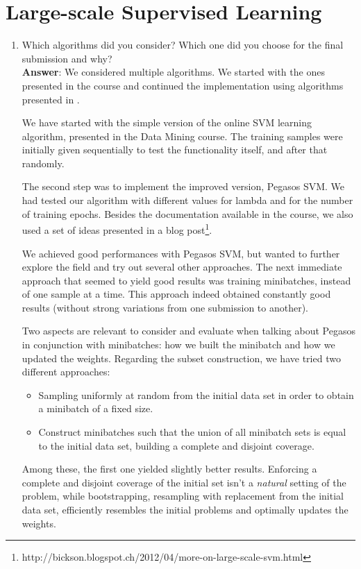 \documentclass[11pt]{article}
\begin{document}
\section{Large-scale Supervised Learning}

\begin{enumerate}
\item Which algorithms did you consider? Which one did you choose for the
  final submission and why? \\
  
\textbf{Answer}: We considered multiple algorithms. We started with the
ones presented in the course and continued the implementation using
algorithms presented in \cite{Sculley09}.

We have started with the simple version of the online SVM learning
algorithm, presented in the Data Mining course. The training samples
were initially given sequentially to test the functionality itself, and
after that randomly.

The second step was to implement the improved version, Pegasos SVM. We
had tested our algorithm with different values for lambda and for the number 
of training epochs. 
Besides the documentation available in the course, we also used
a set of ideas presented in a blog post\footnote{
http://bickson.blogspot.ch/2012/04/more-on-large-scale-svm.html}.

We achieved good performances with Pegasos SVM, but wanted to further
explore the field and try out several other approaches. The next
immediate approach that seemed to yield good results was training
minibatches, instead of one sample at a time. This approach indeed
obtained constantly good results (without strong variations from one
submission to another).

Two aspects are relevant to consider and evaluate when talking about
Pegasos in conjunction with minibatches: how we built the minibatch and
how we updated the weights. Regarding the subset construction, we have
tried two different approaches:
\begin{itemize}
\item{Sampling uniformly at random from the initial data set in order
to obtain a minibatch of a fixed size.}
\item{Construct minibatches such that the union of all minibatch sets 
is equal to the initial data set, building a complete and disjoint coverage.}
\end{itemize}

Among these, the first one yielded slightly better results. Enforcing a
complete and disjoint coverage of the initial set isn't a \emph{natural}
setting of the problem, while bootstrapping, resampling with replacement
from the initial data set, efficiently resembles the initial problems
and optimally updates the weights.


\end{enumerate}
\end{document}
